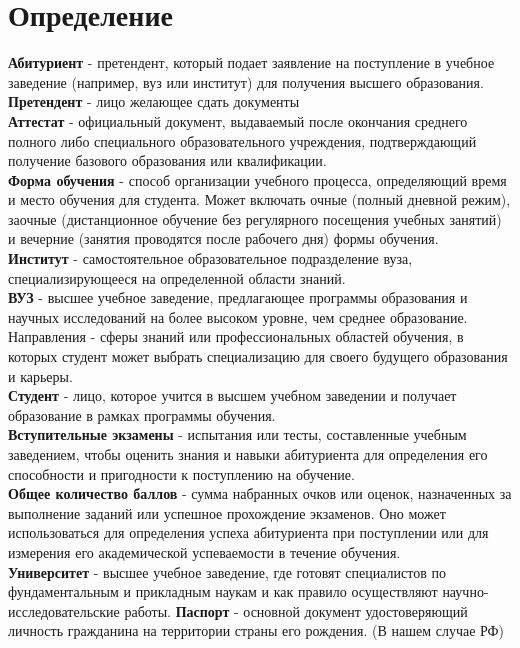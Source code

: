 \documentclass[areasetadvanced]{scrartcl}
\begin{document}
\section{Определение}
\textbf{Абитуриент} - претендент, который подает заявление на поступление в учебное заведение
(например, вуз или институт) для получения высшего образования. \\
\textbf{Претендент} - лицо желающее сдать документы \\
\textbf{Аттестат} - официальный документ, выдаваемый после окончания среднего полного либо
специального образовательного учреждения, подтверждающий получение базового
образования или квалификации.\\ 
\textbf{Форма обучения} - способ организации учебного процесса, определяющий время и место
обучения для студента. Может включать очные (полный дневной режим), заочные
(дистанционное обучение без регулярного посещения учебных занятий) и вечерние (занятия
проводятся после рабочего дня) формы обучения.\\
\textbf{Институт} - самостоятельное образовательное подразделение вуза, специализирующееся на
определенной области знаний.\\
\textbf{ВУЗ} - высшее учебное заведение, предлагающее программы образования и научных
исследований на более высоком уровне, чем среднее образование. Направления - сферы
знаний или профессиональных областей обучения, в которых студент может выбрать
специализацию для своего будущего образования и карьеры.\\
\textbf{Студент} - лицо, которое учится в высшем учебном заведении и получает образование в
рамках программы обучения.\\
\textbf{Вступительные экзамены} - испытания или тесты, составленные учебным заведением,
чтобы оценить знания и навыки абитуриента для определения его способности и
пригодности к поступлению на обучение.\\
\textbf{Общее количество баллов} - сумма набранных очков или оценок, назначенных за
выполнение заданий или успешное прохождение экзаменов. Оно может использоваться для
определения успеха абитуриента при поступлении или для измерения его академической
успеваемости в течение обучения.\\
\textbf{Университет} - высшее учебное заведение, где готовят специалистов по фундаментальным и
прикладным наукам и как правило осуществляют научно-исследовательские работы.
\textbf{Паспорт} - основной документ удостоверяющий личность гражданина на территории страны
его рождения. (В нашем случае РФ)\\
\end{document}
